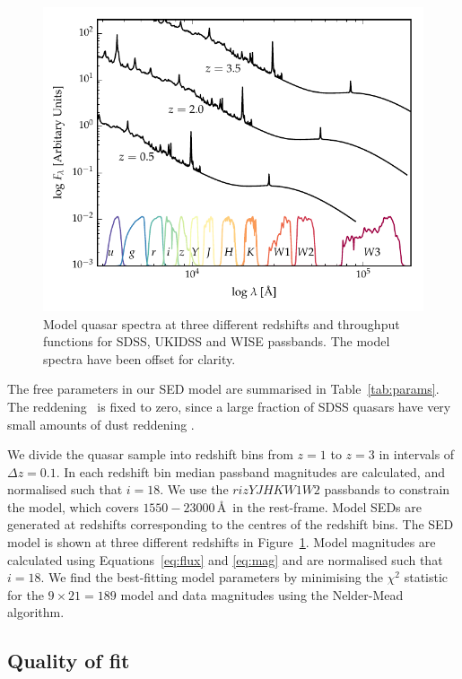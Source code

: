\begin{figure}
  \centering
  \includegraphics[width=\textwidth]{figures/chapter05/throughput.pdf}
  \caption[{Model quasar spectrum at three different redshifts.}]{Model quasar spectra at three different redshifts and throughput functions for SDSS, UKIDSS and WISE passbands. The model spectra have been offset for clarity.}
  \label{fig:filters}
\end{figure}

The free parameters in our SED model are summarised in Table~\ref{tab:params}.
The reddening \ebv\, is fixed to zero, since a large fraction of SDSS quasars have very small amounts of dust reddening \citep{richards03}.

We divide the quasar sample into redshift bins from $z=1$ to $z=3$ in intervals of $\Delta z = 0.1$.
In each redshift bin median passband magnitudes are calculated, and normalised such that $i=18$.
We use the $rizYJHKW1W2$ passbands to constrain the model, which covers $1550-23000$\,\AA\, in the rest-frame.
Model SEDs are generated at redshifts corresponding to the centres of the redshift bins.
The SED model is shown at three different redshifts in Figure~\ref{fig:filters}.
Model magnitudes are calculated using Equations~\ref{eq:flux} and \ref{eq:mag} and are normalised such that $i=18$.
We find the best-fitting model parameters by minimising the $\chi^2$ statistic for the $9 \times 21 = 189$ model and data magnitudes using the Nelder-Mead algorithm.

\subsection{Quality of fit}


